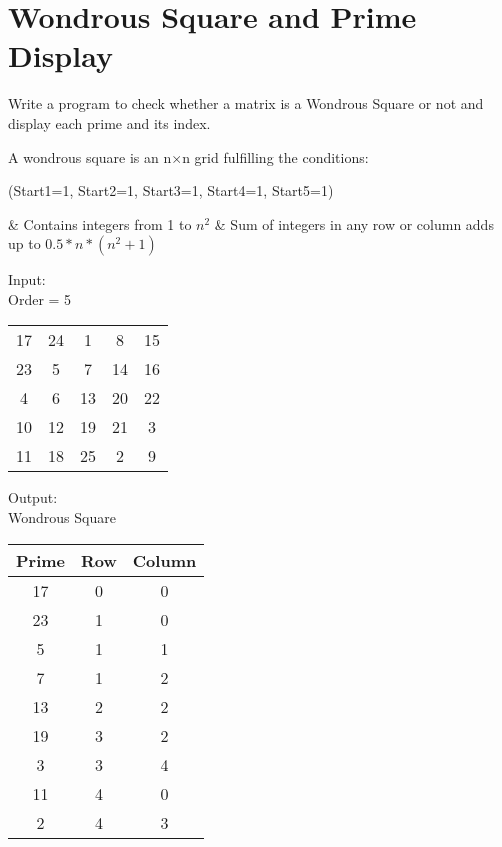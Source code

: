 \documentclass[ProgramminAssignment.tex]{subfiles}
\begin{document}
\section{Wondrous Square and Prime Display}
Write a program to check whether a matrix is a Wondrous Square or not and display each prime and its index.

A wondrous square is an n$\times$n grid fulfilling the conditions:
\begin{easylist}
\ListProperties(Start1=1, Start2=1, Start3=1, Start4=1, Start5=1)

	& Contains integers from 1 to $n^2$
	& Sum of integers in any row or column adds up to $0.5 * n * (n^2 + 1)$
	
\end{easylist}	

Input:\\
Order = 5

\begin{tabular}{ccccc}
17 &	24 &	1  &	8  &	15\\	
23 &	5  &	7  &	14 &	16\\
4  &	6  &	13 &	20 &	22\\	
10 & 	12 &	19 &	21 &	3\\	
11 &	18 &	25 &	2  &	9\\	
\end{tabular}

Output:\\
Wondrous Square

\begin{tabular}{|c|c|c|}
\hline Prime &	Row & Column\\\hline
17	&0	&0\\
23	&1	&0\\
5	&1	&1\\
7	&1	&2\\
13	&2	&2\\
19	&3	&2\\
3	&3	&4\\
11	&4	&0\\
2	&4	&3\\\hline
\end{tabular}
\end{document}
